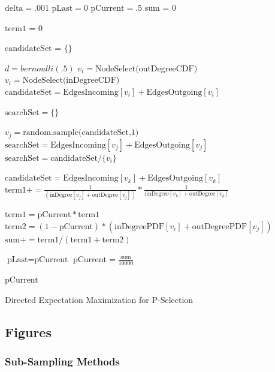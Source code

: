 \documentclass[pdftex,11pt,a4paper,twocolumn]{scrartcl}
\begin{document}
\begin{algorithm}[H]
\begin{algorithmic}
\STATE $\mbox{delta} = .001$
\STATE $\mbox{pLast} = 0$
\STATE $\mbox{pCurrent} = .5$
\STATE $\mbox{sum = 0}$

\STATE $\mbox{term1 = 0}$

\STATE $\mbox{candidateSet = \{\}}$

\STATE $d = bernoulli(.5)$
\STATE $v_i = \mbox{NodeSelect(outDegreeCDF)}$
\ELSE
\STATE $v_i = \mbox{NodeSelect(inDegreeCDF)}$
\ENDIF
\STATE $\mbox{candidateSet} = \mbox{EdgesIncoming}[v_i] + \mbox{EdgesOutgoing}[v_i]$
\ENDWHILE

\STATE $\mbox{searchSet} = \{\}$

\STATE $v_j = \mbox{random.sample(candidateSet,1)}$
\STATE $\mbox{searchSet} = \mbox{EdgesIncoming}[v_j] + \mbox{EdgesOutgoing}[v_j]$
\STATE $\mbox{searchSet} = \mbox{candidateSet} / \{v_i\}$
\ENDWHILE

\STATE $\mbox{candidateSet} = \mbox{EdgesIncoming}[v_k] + \mbox{EdgesOutgoing}[v_k]$
\STATE $\mbox{term1} += \frac{1}{(\mbox{inDegree}[v_j] + \mbox{outDegree}[v_j])} * \frac{1}{(\mbox{inDegree}[v_k] + \mbox{outDegree}[v_k]}$
\ENDIF
\ENDFOR

\STATE $\mbox{term1} = \mbox{pCurrent} * \mbox{term1}$
\STATE $\mbox{term2} = (1-\mbox{pCurrent})*(\mbox{inDegreePDF}[v_i] + \mbox{outDegreePDF}[v_j])$
\STATE $\mbox{sum} += \mbox{term1}/(\mbox{term1}+\mbox{term2})$

\ENDFOR
\STATE $\mbox{pLast}=\mbox{pCurrent}$
\STATE $\mbox{pCurrent} = \frac{\mbox{sum}}{10000}$
\ENDWHILE

\RETURN pCurrent

\end{algorithmic}
\caption{Directed Expectation Maximization for P-Selection}
\label{fig:pLearn1}
\end{algorithm}


\pagebreak

\twocolumn
\subsection{Figures}

\subsubsection{Sub-Sampling Methods}
\label{sec:ssFigures}
\end{document}
